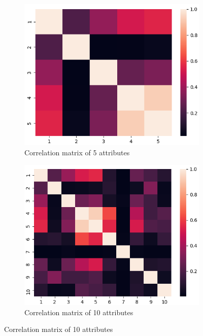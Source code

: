 \begin{figure}[h]
	\centering
\begin{subfigure}[b]{0.3\textwidth}
	\centering
	\includegraphics[width=\textwidth]{pictures/bioliq5}
	\caption{Correlation matrix of 5 attributes}
	\label{fig:matrix5}
\end{subfigure}
\hfill
\begin{subfigure}[b]{0.3\textwidth}
	\centering
	\includegraphics[width=\textwidth]{pictures/bioliq10}
	\caption{Correlation matrix of 10 attributes}
	\label{fig:matrix10}
\end{subfigure}

\end{figure}
